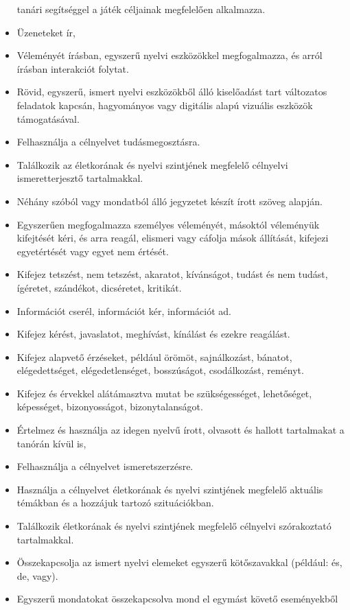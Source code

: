 \begin{itemize}
  tanári segítséggel a játék céljainak megfelelően alkalmazza.
\item
  Üzeneteket ír,
\item
  Véleményét írásban, egyszerű nyelvi eszközökkel megfogalmazza, és
  arról írásban interakciót folytat.
\item
  Rövid, egyszerű, ismert nyelvi eszközökből álló kiselőadást tart
  változatos feladatok kapcsán, hagyományos vagy digitális alapú
  vizuális eszközök támogatásával.
\item
  Felhasználja a célnyelvet tudásmegosztásra.
\item
  Találkozik az életkorának és nyelvi szintjének megfelelő célnyelvi
  ismeretterjesztő tartalmakkal.
\item
  Néhány szóból vagy mondatból álló jegyzetet készít írott szöveg
  alapján.
\item
  Egyszerűen megfogalmazza személyes véleményét, másoktól véleményük
  kifejtését kéri, és arra reagál, elismeri vagy cáfolja mások
  állítását, kifejezi egyetértését vagy egyet nem értését.
\item
  Kifejez tetszést, nem tetszést, akaratot, kívánságot, tudást és nem
  tudást, ígéretet, szándékot, dicséretet, kritikát.
\item
  Információt cserél, információt kér, információt ad.
\item
  Kifejez kérést, javaslatot, meghívást, kínálást és ezekre reagálást.
\item
  Kifejez alapvető érzéseket, például örömöt, sajnálkozást, bánatot,
  elégedettséget, elégedetlenséget, bosszúságot, csodálkozást, reményt.
\item
  Kifejez és érvekkel alátámasztva mutat be szükségességet, lehetőséget,
  képességet, bizonyosságot, bizonytalanságot.
\item
  Értelmez és használja az idegen nyelvű írott, olvasott és hallott
  tartalmakat a tanórán kívül is,
\item
  Felhasználja a célnyelvet ismeretszerzésre.
\item
  Használja a célnyelvet életkorának és nyelvi szintjének megfelelő
  aktuális témákban és a hozzájuk tartozó szituációkban.
\item
  Találkozik életkorának és nyelvi szintjének megfelelő célnyelvi
  szórakoztató tartalmakkal.
\item
  Összekapcsolja az ismert nyelvi elemeket egyszerű kötőszavakkal
  (például: és, de, vagy).
\item
  Egyszerű mondatokat összekapcsolva mond el egymást követő eseményekből

\end{itemize}
